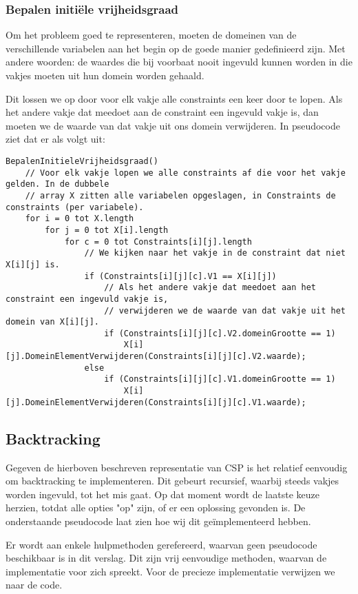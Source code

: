 \documentclass[]{report}
\begin{document}
\subsubsection{Bepalen initi\"{e}le vrijheidsgraad}
Om het probleem goed te representeren, moeten de domeinen van de verschillende variabelen aan het begin op de goede manier gedefinieerd zijn. Met andere woorden: de waardes die bij voorbaat nooit ingevuld kunnen worden in die vakjes moeten uit hun domein worden gehaald.

Dit lossen we op door voor elk vakje alle constraints een keer door te lopen. Als het andere vakje dat meedoet aan de constraint een ingevuld vakje is, dan moeten we de waarde van dat vakje uit ons domein verwijderen. In pseudocode ziet dat er als volgt uit:

\begin{minipage}{\textwidth}
\begin{lstlisting}
BepalenInitieleVrijheidsgraad()
	// Voor elk vakje lopen we alle constraints af die voor het vakje gelden. In de dubbele
	// array X zitten alle variabelen opgeslagen, in Constraints de constraints (per variabele).
	for i = 0 tot X.length
		for j = 0 tot X[i].length
			for c = 0 tot Constraints[i][j].length
				// We kijken naar het vakje in de constraint dat niet X[i][j] is.
				if (Constraints[i][j][c].V1 == X[i][j])
					// Als het andere vakje dat meedoet aan het constraint een ingevuld vakje is,
					// verwijderen we de waarde van dat vakje uit het domein van X[i][j].
					if (Constraints[i][j][c].V2.domeinGrootte == 1)
						X[i][j].DomeinElementVerwijderen(Constraints[i][j][c].V2.waarde);
				else
					if (Constraints[i][j][c].V1.domeinGrootte == 1)
						X[i][j].DomeinElementVerwijderen(Constraints[i][j][c].V1.waarde);
\end{lstlisting}
\end{minipage}

\subsection{Backtracking}
Gegeven de hierboven beschreven representatie van CSP is het relatief eenvoudig om backtracking te implementeren. Dit gebeurt recursief, waarbij steeds vakjes worden ingevuld, tot het mis gaat. Op dat moment wordt de laatste keuze herzien, totdat alle opties "op" zijn, of er een oplossing gevonden is. De onderstaande pseudocode laat zien hoe wij dit ge\"{i}mplementeerd hebben. 

Er wordt aan enkele hulpmethoden gerefereerd, waarvan geen pseudocode beschikbaar is in dit verslag. Dit zijn vrij eenvoudige methoden, waarvan de implementatie voor zich spreekt. Voor de precieze implementatie verwijzen we naar de code.
\end{document}
